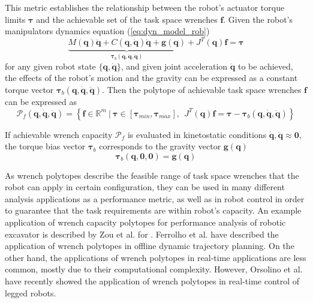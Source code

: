 This metric establishes the relationship between the robot's actuator torque limits $\bm{\tau}$ and the achievable set of the task space wrenches $\bm{f}$.
Given the robot's manipulators dynamics equation (\ref{eq:dyn_model_rob}) 
\begin{equation}
\underbrace{M(\bm{q})\ddot{\bm{q}} + C(\bm{q},\dot{\bm{q}})\dot{\bm{q}} + \bm{g}(\bm{q})}_{\bm{\tau}_b(\bm{q},\dot{\bm{q}},\ddot{\bm{q}})} + J^T(\bm{q})\bm{f} = \bm{\tau} 
\end{equation}
for any given robot state $\{\bm{q},\dot{\bm{q}}\}$, and given joint acceleration $\ddot{\bm{q}}$ to be achieved, the effects of the robot's motion and the gravity can be expressed as a constant torque vector $\bm{\tau}_b(\bm{q},\dot{\bm{q}},\ddot{\bm{q}})$. Then the polytope of achievable task space wrenches $\bm{f}$ can be expressed as
\begin{equation}
    \mathcal{P}_f(\bm{q},\dot{\bm{q}},\ddot{\bm{q}}) = \left\{ \bm{f} \in \mathbb{R}^m ~|~ \bm{\tau}\in\left[\bm{\tau}_{min}, \bm{\tau}_{max} \right], ~~ J^T(\bm{q})\bm{f} = \bm{\tau} -\bm{\tau}_b(\bm{q},\dot{\bm{q}},\ddot{\bm{q}}) \right\}
    \label{eq:poly_force_rob}
\end{equation}

If achievable wrench capacity $\mathcal{P}_f$ is evaluated in kinetostatic conditions $\dot{\bm{q}},\ddot{\bm{q}}\approx\bm{0}$, the torque bias vector $\bm{\tau}_b$ corresponds to the gravity vector $\bm{g}(\bm{q})$ 
\begin{equation}
    \bm{\tau}_b(\bm{q},\bm{0},\bm{0}) = \bm{g}(\bm{q})
\end{equation}

As wrench polytopes describe the feasible range of task space wrenches that the robot can apply in certain configuration, they can be used in many different analysis applications as a performance metric, as well as in robot control in order to guarantee that the task requirements are within robot's capacity. An example application of wrench capacity polytopes for performance analysis of robotic excavator is described by Zou et al. for \cite{Zou2019}. Ferrolho et al. \cite{ferrolho_residual_2020} have described the application of wrench polytopes in offline dynamic trajectory planning. On the other hand, the applications of wrench polytopes in real-time applications are less common, mostly due to their computational complexity. However, Orsolino et al. \cite{Orsolino2018} have recently showed the application of wrench polytopes in real-time control of legged robots.

